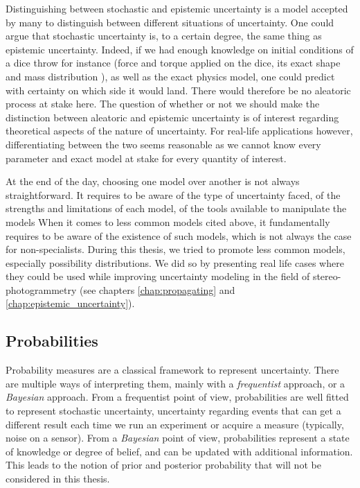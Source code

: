 \begin{remark}
    Distinguishing between stochastic and epistemic uncertainty is a model accepted by many to distinguish between different situations of uncertainty. One could argue that stochastic uncertainty is, to a certain degree, the same thing as epistemic uncertainty. Indeed, if we had enough knowledge on initial conditions of a dice throw for instance (force and torque applied on the dice, its exact shape and mass distribution \etc), as well as the exact physics model, one could predict with certainty on which side it would land. There would therefore be no aleatoric process at stake here. The question of whether or not we should make the distinction between aleatoric and epistemic uncertainty is of interest regarding theoretical aspects of the nature of uncertainty. For real-life applications however, differentiating between the two seems reasonable as we cannot know every parameter and exact model at stake for every quantity of interest. 
\end{remark}

At the end of the day, choosing one model over another is not always straightforward. It requires to be aware of the type of uncertainty faced, of the strengths and limitations of each model, of the tools available to manipulate the models \etc When it comes to less common models cited above, it fundamentally requires to be aware of the existence of such models, which is not always the case for non-specialists. During this thesis, we tried to promote less common models, especially possibility distributions. We did so by presenting real life cases where they could be used while improving uncertainty modeling in the field of stereo-photogrammetry (see chapters \ref{chap:propagating} and \ref{chap:epistemic_uncertainty}). 

\subsection{Probabilities}\label{sec:probabilities}
Probability measures are a classical framework to represent uncertainty. There are multiple ways of interpreting them, mainly with a \textit{frequentist} approach, or a \textit{Bayesian} approach. From a frequentist point of view, probabilities are well fitted to represent stochastic uncertainty, \ie uncertainty regarding events that can get a different result each time we run an experiment or acquire a measure (typically, noise on a sensor). From a \textit{Bayesian} point of view, probabilities represent a state of knowledge or degree of belief, and can be updated with additional information. This leads to the notion of prior and posterior probability that will not be considered in this thesis.

